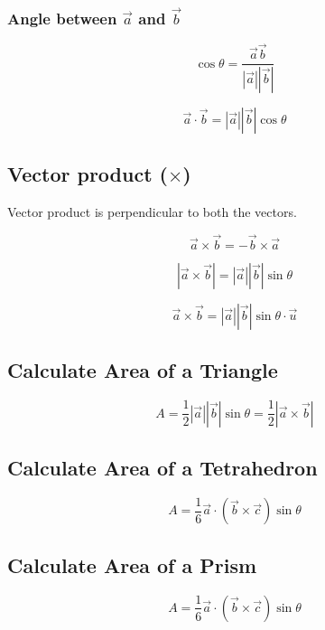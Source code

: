 \documentclass[a4paper,9pt]{scrartcl}
\newcommand{\vecabs}[1]{\left| \vec{#1} \right|}
\newcommand{\abs}[1]{\left| #1 \right|}
\begin{document}
    \subsubsection{Angle between $\vec{a}$ and $\vec{b}$}
    \begin{displaymath}
        \cos\theta = \frac{\vec{a}\vec{b}}{\vecabs{a}\vecabs{b}}
    \end{displaymath}

    \begin{displaymath}
        \vec{a}\cdot\vec{b} = \vecabs{a}\vecabs{b}\cos\theta
    \end{displaymath}

    \subsection{Vector product ($\times$)}
    Vector product is perpendicular to both the vectors.

    \begin{displaymath}
        \vec{a}\times\vec{b} = -\vec{b}\times\vec{a}
    \end{displaymath}

    \begin{displaymath}
        \abs{\vec{a}\times\vec{b}} = \vecabs{a}\vecabs{b}\sin\theta
    \end{displaymath}

    \begin{displaymath}
        \vec{a}\times\vec{b} = \vecabs{a}\vecabs{b}\sin\theta\cdot\vec{u}
    \end{displaymath}

    \subsection{Calculate Area of a Triangle}
    \begin{displaymath}
        A = \frac{1}{2}\vecabs{a}\vecabs{b}\sin\theta = \frac{1}{2}\abs{\vec{a}\times\vec{b}}
    \end{displaymath}

    \subsection{Calculate Area of a Tetrahedron}
    \begin{displaymath}
        A = \frac{1}{6}\vec{a}\cdot\left( \vec{b}\times\vec{c} \right)\sin\theta
    \end{displaymath}

    \subsection{Calculate Area of a Prism}
    \begin{displaymath}
        A = \frac{1}{6}\vec{a}\cdot\left( \vec{b}\times\vec{c} \right)\sin\theta
    \end{displaymath}
\end{document}
